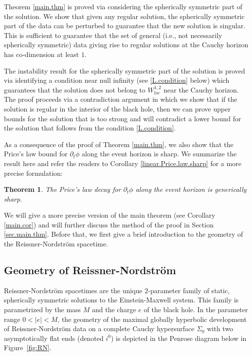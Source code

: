 \documentclass[12 pt, reqno]{amsart}
\newtheorem{theorem}{Theorem}[section]
\theoremstyle{definition}
\theoremstyle{remark}
\numberwithin{equation}{section}
\newcommand{\rd}{\partial}
\newcommand{\0}{\emptyset}
\newcommand{\Sgm}{\Sigma}
\begin{document}
Theorem \ref{main.thm} is proved via considering the spherically symmetric part of the solution. We show that given any regular solution, the spherically symmetric part of the data can be perturbed to guarantee that the new solution is singular. This is sufficient to guarantee that the set of general (i.e., not necessarily spherically symmetric) data giving rise to regular solutions at the Cauchy horizon has co-dimension at least $1$.  

The instability result for the spherically symmetric part of the solution is proved via identifying a condition near null infinity (see \eqref{L.condition} below) which guarantees that the solution does not belong to $W^{1,2}_{loc}$ near the Cauchy horizon. The proof proceeds via a contradiction argument in which we show that if the solution is regular in the interior of the black hole, then we can prove upper bounds for the solution that is too strong and will contradict a lower bound for the solution that follows from the condition \eqref{L.condition}.

As a consequence of the proof of Theorem \ref{main.thm}, we also show that the Price's law bound for $\rd_t\phi$ along the event horizon is sharp. We summarize the result here and refer the readers to Corollary \ref{linear.Price.law.sharp} for a more precise formulation:
\begin{theorem}
The Price's law decay for $\rd_t\phi$ along the event horizon is generically sharp.
\end{theorem}

We will give a more precise version of the main theorem (see Corollary \ref{main.cor}) and will further discuss the method of the proof in Section \ref{sec.main.thm}. Before that, we first give a brief introduction to the geometry of the Reissner-Nordstr\"om spacetime.

\subsection{Geometry of Reissner-Nordstr\"om}\label{sec.geometry}
Reissner-Nordstr\"om spacetimes are the unique $2$-parameter family of static, spherically symmetric solutions to the Einstein-Maxwell system. This family is parametrized by the mass $M$ and the charge $e$ of the black hole. In the parameter range $0<|e|<M$, the geometry of the maximal globally hyperbolic development of Reissner-Nordstr\"om data on a complete Cauchy hypersurface $\Sgm_{0}$ with two asymptotically flat ends (denoted $i^{0}$) is depicted in the Penrose diagram below in Figure~\ref{fig:RN}.
\end{document}
